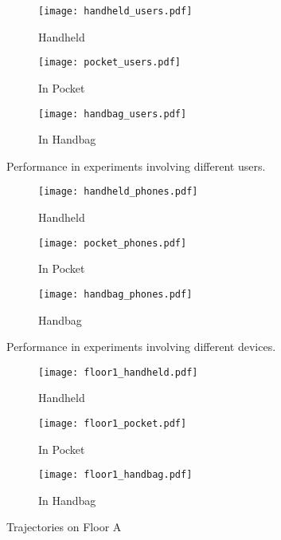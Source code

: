\documentclass[letterpaper]{article}
\begin{document}
	\begin{figure*}
    	\centering
        \begin{subfigure}[t]{0.3\textwidth}
        	\texttt{[image: handheld\_users.pdf]}
        	\caption{\label{fig:hand_users} Handheld}
        \end{subfigure}
        \begin{subfigure}[t]{0.3\textwidth}
        	\texttt{[image: pocket\_users.pdf]}
        	\caption{\label{fig:pocket_users} In Pocket}
        \end{subfigure}
        \begin{subfigure}[t]{0.3\textwidth}
        	\texttt{[image: handbag\_users.pdf]}
        	\caption{\label{fig:handbag_users} In Handbag}
        \end{subfigure}
        \caption{\label{fig:multi_users} Performance in experiments involving different users.}
    \end{figure*}

	\begin{figure*}
    	\centering
        \begin{subfigure}[t]{0.3\textwidth}
        	\texttt{[image: handheld\_phones.pdf]}
        	\caption{\label{fig:hand_phones} Handheld}
        \end{subfigure}
        \begin{subfigure}[t]{0.3\textwidth}
        	\texttt{[image: pocket\_phones.pdf]}
        	\caption{\label{fig:pocket_phones} In Pocket}
        \end{subfigure}
        \begin{subfigure}[t]{0.3\textwidth}
        	\texttt{[image: handbag\_phones.pdf]}
        	\caption{\label{fig:handbag_phones} Handbag}
        \end{subfigure}
        \caption{\label{fig:multi_phones} Performance in experiments involving different devices.}
    \end{figure*}

	\begin{figure*}
    	\centering
        \begin{subfigure}[t]{0.3\textwidth}
        	\texttt{[image: floor1\_handheld.pdf]}
        	\caption{\label{fig:floor1_hand_phones} Handheld}
        \end{subfigure}
        \begin{subfigure}[t]{0.3\textwidth}
        	\texttt{[image: floor1\_pocket.pdf]}
        	\caption{\label{fig:floor1_pocket_phones} In Pocket}
        \end{subfigure}
        \begin{subfigure}[t]{0.3\textwidth}
        	\texttt{[image: floor1\_handbag.pdf]}
        	\caption{\label{fig:floor1_handbag_phones} In Handbag}
        \end{subfigure}
        \caption{\label{fig:floor1} Trajectories on Floor A}
    \end{figure*}
    
\end{document}
